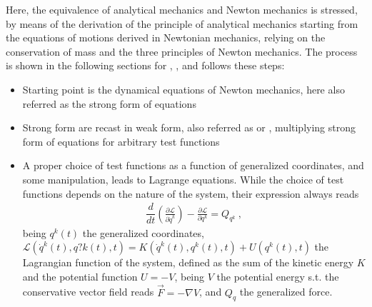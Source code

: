 \documentclass[letterpaper,10pt,english]{jupyterBook}
\begin{document}
\sphinxAtStartPar
Here, the equivalence of analytical mechanics and Newton mechanics is stressed, by means of the derivation of the principle of analytical mechanics starting from the equations of motions derived in Newtonian mechanics, relying on the conservation of mass and the three principles of Newton mechanics. The process is shown in the following sections for {\hyperref[\detokenize{ch/lagrange-point:classical-mechanics-lagrange-point}]{}}, {\hyperref[\detokenize{ch/lagrange-points:classical-mechanics-lagrange-points}]{}}, {\hyperref[\detokenize{ch/lagrange-rigid-body:classical-mechanics-lagrange-rigid}]{}} and follows these steps:
\begin{itemize}
\item {} 
\sphinxAtStartPar
{} Starting point is the dynamical equations of Newton mechanics, here also referred as the strong form of equations

\item {} 
\sphinxAtStartPar
{} Strong form are recast in weak form, also referred as  or , multiplying strong form of equations for arbitrary test functions

\item {} 
\sphinxAtStartPar
{} A proper choice of test functions as a function of generalized coordinates, and some manipulation, leads to Lagrange equations. While the choice of test functions depends on the nature of the system, their expression always reads
\begin{equation*}
\begin{split}\dfrac{d}{dt}\left( \frac{\partial \mathscr{L}}{\partial \dot{q}^k} \right) - \frac{\partial \mathscr{L}}{\partial q^k} = Q_{q^k} \ ,\end{split}
\end{equation*}
\sphinxAtStartPar
being \(q^k(t)\) the generalized coordinates, \(\mathscr{L}\left(\dot{q}^k(t), q?k(t), t \right) = K\left(\dot{q}^k(t), q^k(t), t\right) + U(q^k(t), t)\) the Lagrangian function of the system, defined as the sum of the kinetic energy \(K\) and the potential function \(U = - V\), being \(V\) the potential energy \sphinxhyphen{} s.t. the conservative vector field reads \(\vec{F} = - \nabla V\), and \(Q_q\) the generalized force.


\end{itemize}
\end{document}
